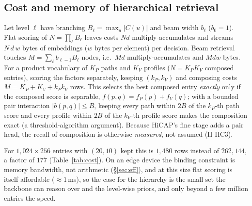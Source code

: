 \subsection{Cost and memory of hierarchical retrieval}
\begin{proposition}\label{prop:cost}
Let level $\ell$ have branching $B_\ell=\max_u|C(u)|$ and beam width $b_\ell$ ($b_0=1$). Flat scoring of
$N=\prod_\ell B_\ell$ leaves costs $Nd$ multiply-accumulates and streams $N\,d\,w$ bytes of embeddings ($w$ bytes per element)
per decision. Beam retrieval touches $M=\sum_{\ell}b_{\ell-1}B_\ell$ nodes, i.e.\ $Md$ multiply-accumulates and $Mdw$ bytes.
For a product vocabulary of $K_P$ paths and $K_V$ profiles ($N=K_PK_V$ composed entries), scoring the factors separately, keeping $(k_P,k_V)$ and composing costs $M=K_P+K_V+k_Pk_V$ rows. This selects the best composed entry \emph{exactly} only if the composed score is separable, $f(p,q)=f_P(p)+f_V(q)$; with a bounded pair interaction $|b(p,q)|\le B$, keeping every path within $2B$ of the $k_P$-th path score and every profile within $2B$ of the $k_V$-th profile score makes the composition exact (a threshold-algorithm argument). Because HiCAP's fine stage adds a pair head, the recall of composition is otherwise \emph{measured}, not assumed (H-HC3).
\end{proposition}
\noindent For $1{,}024\times256$ entries with $(20,10)$ kept this is $1{,}480$ rows instead of $262{,}144$, a factor of $177$ (Table~\ref{tab:cost}). On an edge device the binding constraint is memory bandwidth, not arithmetic (\S\ref{sec:eff}), and at this size flat scoring is itself affordable ($\approx1$\,ms), so the case for the hierarchy is the small set the backbone can reason over and the level-wise priors, and only beyond a few million entries the speed.

